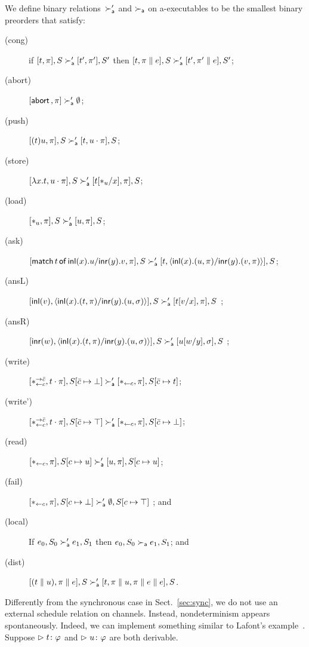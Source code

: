 \documentclass[envcountsame]{llncs}
\begin{document}
We define binary relations~$\succ_{\mathsf a}'$ and $\succ_{\mathsf a}$ on a-executables to be the smallest binary preorders
that satisfy:
\begin{description}
 \item[(cong)] if
	    $[t,\pi],         S \succ_{\mathsf a}' [ t',\pi'],        S'$
	    then
	    $[t,\pi \parallel e], S \succ_{\mathsf a}' [ t',\pi'\parallel e], S'$\enspace;
 \item[(abort)] $[\mathsf{abort\,},\pi] \succ_{\mathsf a}' \emptyset$\enspace;
 \item[(push)]
	    $[(t)u,\pi],S       \succ_{\mathsf a}' [t,u\cdot\pi],S$;
 \item[(store)]
	    $[\lambda x.t,u\cdot\pi],S
	     \succ_{\mathsf a}'
	     [t[\ast_u/x],      \pi],S$\enspace;
 \item[(load)]
	    $[\ast_u,\pi],S\succ_{\mathsf a}'[u,\pi],S$\enspace;
 \item[(ask)]
      $[\mathsf{match}\,{t}\,\mathsf{of}\, \mathsf{inl}({x}). {u}/ \mathsf{inr}({y}). {v},\pi], S\succ_{\mathsf a}' [t,\langle \mathsf{inl}({x}). ({u},{\pi})/ \mathsf{inr}({y}). ({v},{\pi})\rangle], S$\enspace;
 \item[(ansL)]
      $[\mathsf{inl}({v}), \langle \mathsf{inl}({x}). ({t},{\pi})/ \mathsf{inr}({y}). ({u},{\sigma})\rangle],S \succ_{\mathsf a}' [t[v/x],\pi],S $ \enspace;
 \item[(ansR)]
      $[\mathsf{inr}({w}), \langle \mathsf{inl}({x}). ({t},{\pi})/ \mathsf{inr}({y}). ({u},{\sigma})\rangle],S \succ_{\mathsf a}' [u[w/y],\sigma],S $ \enspace;
 \item[(write)]
	    $
	    [\ast^{\rightarrow {\bar{c}}}_{\leftarrow{c}}, t\cdot\pi], S[\bar{c}\mapsto\bot]
	    \succ_{\mathsf a}'
	    [\ast_{\leftarrow{c}}, \pi],
	    S[\bar{c}\mapsto t]
	    $\enspace;
 \item[(write')]
	    $
	    [\ast^{\rightarrow {\bar{c}}}_{\leftarrow{c}}, t\cdot\pi], S[\bar{c}\mapsto \top]
	    \succ_{\mathsf a}'
	    [\ast_{\leftarrow{c}}, \pi],
	    S[\bar{c}\mapsto \bot]
	    $\enspace;
 \item[(read)]$
	    [\ast_{\leftarrow{c}} ,\pi],
	    S[c\mapsto u]
	    \succ_{\mathsf a}'
	    [u,\pi],
	    S[c\mapsto u]
	    $\enspace;
 \item[(fail)]
	    $
	    [\ast_{\leftarrow{c}},\pi],
	    S[c\mapsto \bot]
	    \succ_{\mathsf a}'
	    \emptyset,S[c\mapsto \top]
	    $
	    \enspace; and
 \item[(local)] If $e_0, S_0\succ_{\mathsf a}'e_1, S_1$ then $e_0, S_0\succ_{\mathsf a} e_1,
      S_1$\enspace; and
 \item[(dist)]
	    $[(t\parallel u),\pi\parallel e],S   \succ_{\mathsf a}' [t,\pi\parallel u,\pi\parallel
      e\parallel e],S$\enspace.
\end{description}
Differently from the synchronous case in Sect.~\ref{sec:sync},
we do not use an external schedule relation on channels.
Instead, nondeterminism appears spontaneously.
Indeed, we can implement something similar to Lafont's
example~\citep[B.1]{girard1989proofs}.
Suppose $\vartriangleright{t} \colon{\varphi}$ and $\vartriangleright{u} \colon{\varphi}$ are both derivable.
\end{document}

